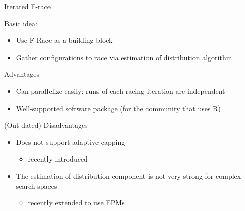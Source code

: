 \begin{frame}[c,fragile]{Iterated F-race~}

Basic idea:
\begin{itemize}
	\item Use F-Race as a building block
	\item Gather configurations to race via estimation of distribution algorithm
\end{itemize}

\pause
\medskip
Advantages 
\begin{itemize}
	\item Can \alert{parallelize easily}: runs of each racing iteration are independent 
	\item Well-supported software package (for the community that uses R)
\end{itemize}

\pause
\medskip
(Out-dated) Disadvantages 
\begin{itemize}
	\item Does not support adaptive capping
	\begin{itemize}
		\item recently introduced 
	\end{itemize}
	\item The estimation of distribution component is not very strong for complex search spaces
	\begin{itemize}
		\item recently extended to use EPMs 
	\end{itemize}
\end{itemize}

\end{frame}




